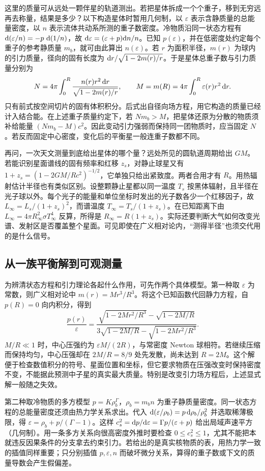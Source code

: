 这里的质量可从远处一颗伴星的轨道测出。若把星体拆成一个个重子，移到无穷远再去称量，结果是多少？以下构造星体时暂用几何制，以 $\varepsilon$ 表示含静质量的总能量密度，以 $n$ 表示流体共动系所测的重子数密度。冷物质沿同一状态方程有 $\dd(\varepsilon/n)=-p\,\dd(1/n)$，故 $\dd\varepsilon=(\varepsilon+p)\dd n/n$。已知 $p(\varepsilon)$，并在低密度处约定每个重子的参考静质量 $m_b$，就可由此算出 $n(\varepsilon)$。若 $r$ 为面积半径，$m(r)$ 为球内的引力质量，径向的固有长度为 $\dd r/\sqrt{1-2m(r)/r}$。于是星体总重子数与引力质量分别为
\[
 N=4\pi\int_0^R\frac{n(r)r^2\,\dd r}{\sqrt{1-2m(r)/r}},
 \qquad M=m(R)=4\pi\int_0^R\varepsilon(r)r^2\,\dd r .
\]
只有前式按空间切片的固有体积积分。后式出自径向场方程，用它构造的质量已经计入结合能。在上述重子质量约定下，若 $Nm_b>M$，把星体还原为分散的物质须补给能量 $(Nm_b-M)c^2$。因此变动引力强弱而保持同一团物质时，应当固定 $N$。若反而固定中心密度，变化后的平衡星一般连重子数都不同。

再问，一次天文测量到底给出星体的哪个量？远处所见的圆轨道周期给出 $GM$。若能识别星面谱线的固有频率和红移 $z_s$，对静止球星又有 $1+z_s=(1-2GM/Rc^2)^{-1/2}$，它单独只给出紧致度。两者合用才有 $R$。用热辐射估计半径也有类似区别。设整颗静止星都以同一温度 $T_s$ 按黑体辐射，且半径在光子球以外。每个光子的能量和单位坐标时发出的光子数各少一个红移因子，故 $L_\infty=L_s/(1+z_s)^2$，而谱温度 $T_\infty=T_s/(1+z_s)$。在已知距离下由 $L_\infty=4\pi R_\infty^2\sigma T_\infty^4$ 反算，所得是 $R_\infty=R(1+z_s)$。实际还要判断大气如何改变光谱、发射区是否覆盖整个星面。可见即使在广义相对论内，“测得半径”也须交代用的是什么信号。

\subsection{从一族平衡解到可观测量}

为辨清状态方程和引力理论各起什么作用，可先作两个具体模型。第一种取 $\varepsilon$ 为常数，则广义相对论中 $m(r)=Mr^3/R^3$。将这个已知函数代回静力方程，自 $p(R)=0$ 向内积分，得到
\[
 \frac{p(r)}{\varepsilon}=
 \frac{\sqrt{1-2Mr^2/R^3}-\sqrt{1-2M/R}}
      {3\sqrt{1-2M/R}-\sqrt{1-2Mr^2/R^3}} .
\]
$M/R\ll1$ 时，中心压强约为 $\varepsilon M/(2R)$，与常密度 Newton 球相符。若继续压缩而保持均匀，中心压强却在 $2M/R=8/9$ 处先发散，尚未达到 $R=2M$。这个解便于检查数值积分的符号、星面位置和坐标，但它要求物质在压强改变时保持密度不变，不能据此预测中子星的真实最大质量。特别是改变引力场方程后，上述显式解一般随之失效。

第二种取冷物质的多方模型 $p=K\rho_b^\Gamma$，$\rho_b=m_b n$ 为重子静质量密度。同一状态方程的总能量密度还须由热力学关系求出。代入 $\dd(\varepsilon/\rho_b)=p\,\dd\rho_b/\rho_b^2$ 并选取稀薄极限，得 $\varepsilon=\rho_b+p/(\Gamma-1)$。这样 $c_s^2=\dd p/\dd\varepsilon=\Gamma p/(\varepsilon+p)$ 给出局域声速平方（几何制）。用一条多方关系向很高密度外推时要检查 $0\le c_s^2\le1$，尤其不能把本就违反因果条件的分支拿去约束引力。若给出的是真实核物质的表，用热力学一致的插值同样重要；只分别插值 $p,\varepsilon,n$ 而破坏微分关系，算得的重子数或下文的质量导数会产生假偏差。

